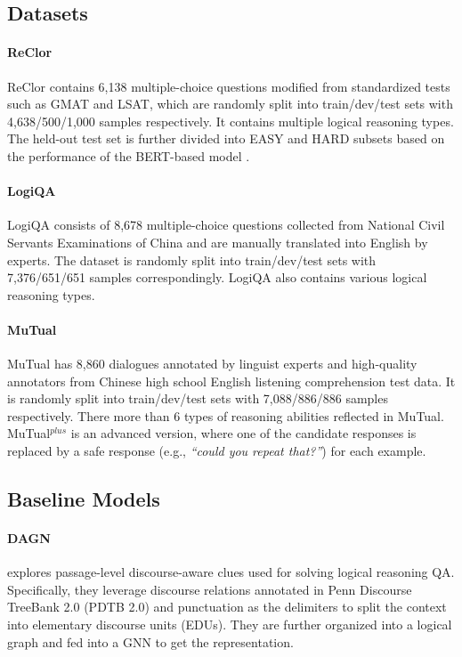 \documentclass[11pt]{article}
\begin{document}
\subsection{Datasets}
\paragraph{ReClor} ReClor contains 6,138 multiple-choice questions modified from standardized tests such as GMAT and LSAT, which are randomly split into train/dev/test sets with 4,638/500/1,000 samples respectively. It contains multiple logical reasoning types. The held-out test set is further divided into EASY and HARD subsets based on the performance of the BERT-based model \cite{devlin-etal-2019-bert}.
\paragraph{LogiQA} LogiQA consists of 8,678 multiple-choice questions collected from National Civil Servants Examinations of China and are manually translated into English by experts. The dataset is randomly split into train/dev/test sets with 7,376/651/651 samples correspondingly. LogiQA also contains various logical reasoning types.
\paragraph{MuTual}  MuTual has 8,860 dialogues annotated by linguist experts and high-quality annotators from Chinese high school English listening comprehension test data. It is randomly split into train/dev/test sets with 7,088/886/886 samples respectively. There more than $6$ types of reasoning abilities reflected in MuTual. MuTual$^{plus}$ is an advanced version, where one of the candidate responses is replaced by a safe response (e.g., \textit{``could you repeat that?''}) for each example.
\subsection{Baseline Models}
\paragraph{DAGN} explores passage-level discourse-aware clues used for solving logical reasoning QA. Specifically, they leverage discourse relations annotated in Penn Discourse TreeBank 2.0 (PDTB 2.0) \citep{prasad2008penn} and punctuation as the delimiters to split the context into elementary discourse units (EDUs). They are further organized into a logical graph and fed into a GNN to get the representation.
\end{document}
